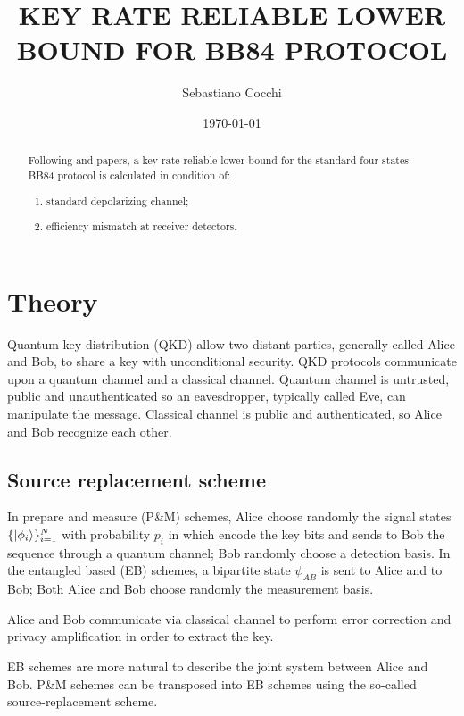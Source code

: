 \documentclass{article}
\title{KEY RATE RELIABLE LOWER BOUND FOR BB84 PROTOCOL}
\author{Sebastiano Cocchi }
\date{\today}
\begin{document}
\maketitle

\begin{abstract}                %
    Following \cite{George_2021} and \cite{Winick2018reliablenumerical} papers, a key rate reliable lower bound for the standard four states BB84 protocol is calculated in condition of:
    \begin{enumerate}
        \item standard depolarizing channel;
        \item efficiency mismatch at receiver detectors.
    \end{enumerate}
\end{abstract}

\tableofcontents

\section{Theory}
Quantum key distribution (QKD) allow two distant parties, generally called Alice and Bob, to share a key with unconditional security.
QKD protocols communicate upon a quantum channel and a classical channel.
Quantum channel is untrusted, public and unauthenticated so an eavesdropper, typically called Eve, can manipulate the message. 
Classical channel is public and authenticated, so Alice and Bob recognize each other.
    \subsection{Source replacement scheme}
    In prepare and measure (P\&M) schemes, Alice choose randomly the signal states \(\{\ket{\phi_i}\}_{i=1}^N\) with probability \(p_i\) in which encode the key bits and sends to Bob the sequence through a quantum channel;
    Bob randomly choose a detection basis.
    In the entangled based (EB) schemes, a bipartite state \(\psi_{AB}\) is sent to Alice and to Bob; Both Alice and Bob choose randomly the measurement basis.

    Alice and Bob communicate via classical channel to perform error correction and privacy amplification in order to extract the key.

    EB schemes are more natural to describe the joint system between Alice and Bob.
    P\&M schemes can be transposed into EB schemes using the so-called source-replacement scheme.
\end{document}
